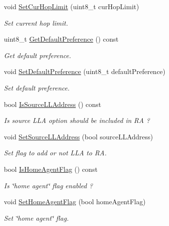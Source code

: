 \begin{DoxyCompactItemize}
void \hyperlink{classns3_1_1RadvdInterface_aa54b6c016c2c444ec88c4338924e3153}{Set\+Cur\+Hop\+Limit} (uint8\+\_\+t cur\+Hop\+Limit)
\begin{DoxyCompactList}\small\item\em Set current hop limit. \end{DoxyCompactList}\item 
uint8\+\_\+t \hyperlink{classns3_1_1RadvdInterface_ac70e19ce82357d905ae86729437283d9}{Get\+Default\+Preference} () const 
\begin{DoxyCompactList}\small\item\em Get default preference. \end{DoxyCompactList}\item 
void \hyperlink{classns3_1_1RadvdInterface_aa5ba8ceeace2757284cc2ba36e4e9e58}{Set\+Default\+Preference} (uint8\+\_\+t default\+Preference)
\begin{DoxyCompactList}\small\item\em Set default preference. \end{DoxyCompactList}\item 
bool \hyperlink{classns3_1_1RadvdInterface_a75f1b6d05ee7d55f1ad1eb078e1d5d04}{Is\+Source\+L\+L\+Address} () const 
\begin{DoxyCompactList}\small\item\em Is source L\+LA option should be included in RA ? \end{DoxyCompactList}\item 
void \hyperlink{classns3_1_1RadvdInterface_a1b73ddfc40718ef1004429617905eb3a}{Set\+Source\+L\+L\+Address} (bool source\+L\+L\+Address)
\begin{DoxyCompactList}\small\item\em Set flag to add or not L\+LA to RA. \end{DoxyCompactList}\item 
bool \hyperlink{classns3_1_1RadvdInterface_ae0ab5e3746b4c72fb8e1d8f3ee902273}{Is\+Home\+Agent\+Flag} () const 
\begin{DoxyCompactList}\small\item\em Is \char`\"{}home agent\char`\"{} flag enabled ? \end{DoxyCompactList}\item 
void \hyperlink{classns3_1_1RadvdInterface_a564fcd935d2111a9ce01c0ed317c33ee}{Set\+Home\+Agent\+Flag} (bool home\+Agent\+Flag)
\begin{DoxyCompactList}\small\item\em Set \char`\"{}home agent\char`\"{} flag. \end{DoxyCompactList}\item 

\end{DoxyCompactItemize}
